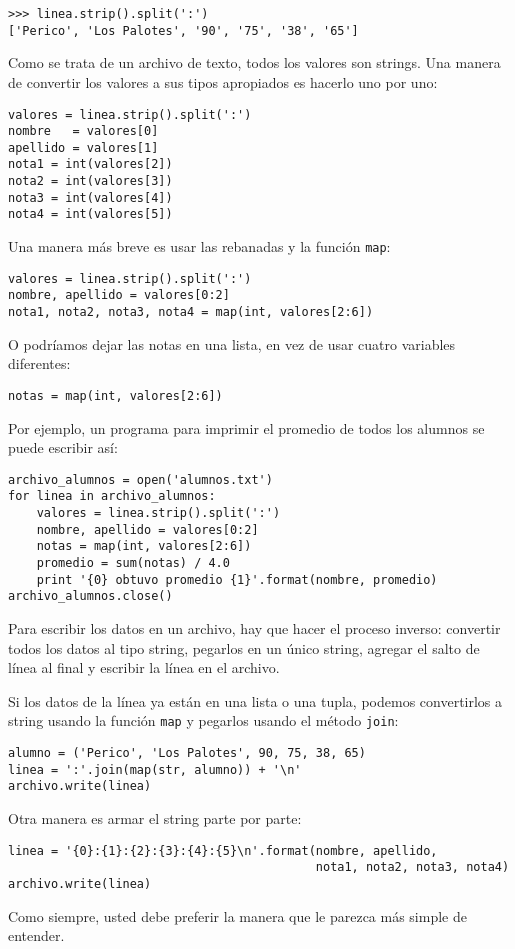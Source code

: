 \begin{lstlisting}
>>> linea.strip().split(':')
['Perico', 'Los Palotes', '90', '75', '38', '65']
\end{lstlisting}

Como se trata de un archivo de texto, todos los valores son strings. Una
manera de convertir los valores a sus tipos apropiados es hacerlo uno
por uno:

\begin{lstlisting}
valores = linea.strip().split(':')
nombre   = valores[0]
apellido = valores[1]
nota1 = int(valores[2])
nota2 = int(valores[3])
nota3 = int(valores[4])
nota4 = int(valores[5])
\end{lstlisting}

Una manera más breve es usar las rebanadas y la función \lstinline!map!:

\begin{lstlisting}
valores = linea.strip().split(':')
nombre, apellido = valores[0:2]
nota1, nota2, nota3, nota4 = map(int, valores[2:6])
\end{lstlisting}

O podríamos dejar las notas en una lista, en vez de usar cuatro
variables diferentes:

\begin{lstlisting}
notas = map(int, valores[2:6])
\end{lstlisting}

Por ejemplo, un programa para imprimir el promedio de todos los alumnos
se puede escribir así:

\begin{lstlisting}
archivo_alumnos = open('alumnos.txt')
for linea in archivo_alumnos:
    valores = linea.strip().split(':')
    nombre, apellido = valores[0:2]
    notas = map(int, valores[2:6])
    promedio = sum(notas) / 4.0
    print '{0} obtuvo promedio {1}'.format(nombre, promedio)
archivo_alumnos.close()
\end{lstlisting}

Para escribir los datos en un archivo, hay que hacer el proceso inverso:
convertir todos los datos al tipo string, pegarlos en un único string,
agregar el salto de línea al final y escribir la línea en el archivo.

Si los datos de la línea ya están en una lista o una tupla, podemos
convertirlos a string usando la función \lstinline!map! y pegarlos
usando el método \lstinline!join!:

\begin{lstlisting}
alumno = ('Perico', 'Los Palotes', 90, 75, 38, 65)
linea = ':'.join(map(str, alumno)) + '\n'
archivo.write(linea)
\end{lstlisting}

Otra manera es armar el string parte por parte:

\begin{lstlisting}
linea = '{0}:{1}:{2}:{3}:{4}:{5}\n'.format(nombre, apellido,
                                           nota1, nota2, nota3, nota4)
archivo.write(linea)
\end{lstlisting}

Como siempre, usted debe preferir la manera que le parezca más simple de
entender.
